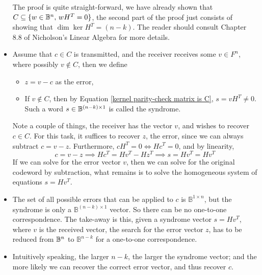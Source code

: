 \documentclass[../../main.tex]{subfiles}
\begin{document}
\begin{itemize}
    The proof is quite straight-forward, we have already shown that $C\subseteq\{w\in \mathbb{B}^n,\, wH^T=0\}$, the second part of the proof just consists of showing that $\dim{\ker{H^T}} = (n-k)$. The reader should consult Chapter 8.8 of Nicholson's Linear Algebra for more details.
    \item Assume that $c\in C$ is transmitted, and the receiver receives some $v\in F^n$, where possibly $v\notin C$, then we define
    \begin{itemize}
        \item $z=v-c$ as the error,
        \item If $v\notin C$, then by Equation \eqref{kernel parity-check matrix is C}, $s=vH^T\neq 0$. Such a word $s\in\mathbb{B}^{(n-k)\times 1}$ is called the syndrome.
    \end{itemize} 
    Note a couple of things, the receiver has the vector $v$, and wishes to recover $c\in C$. For this task, it suffices to recover $z$, the error, since we can always subtract $c = v-z$. Furthermore, $cH^T = 0 \iff Hc^T = 0$, and by linearity, 
    \[
    c = v-z\implies Hc^T = Hv^T - Hz^T\implies s=Hv^T=Hv^T
    \]
    If we can solve for the error vector $v$, then we can solve for the original codeword by subtraction, what remains is to solve the homogeneous system of equations $s = Hv^T$.\\
    
    \item The set of all possible errors that can be applied to $c$ is $\mathbb{B}^{1\times n}$, but the syndrome is only a $\mathbb{B}^{(n-k)\times 1}$ vector. So there can be no one-to-one correspondence. The take-away is this, given a syndrome vector $s = Hv^T$, where $v$ is the received vector, the search for the error vector $z$, has to be reduced from $\mathbb{B}^{n}$ to $\mathbb{B}^{n-k}$ for a one-to-one correspondence.
    \item Intuitively speaking, the larger $n-k$, the larger the syndrome vector; and the more likely we can recover the correct error vector, and thus recover $c$.
\end{itemize}
\end{document}
